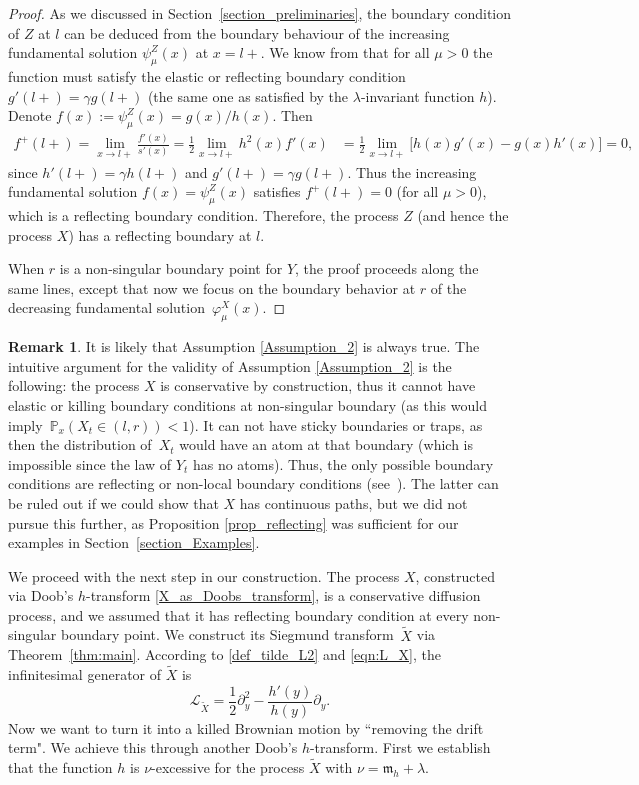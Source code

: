 \documentclass[pdftex]{sigma}
\numberwithin{equation}{section}
\theoremstyle{definition}
\newtheorem{Remark}[Theorem]{Remark}
\def\L{{\mathcal L}}
\def\p{{\mathbb P}}
\begin{document}
\begin{proof}
As we discussed in Section~\ref{section_preliminaries}, the boundary condition of $Z$ at $l$ can be deduced from the boundary behaviour of the increasing fundamental solution $\psi^Z_{\mu}(x)$ at $x=l+$. We know from \cite[Section II.10]{Borodin2002} that for all $\mu>0$ the function  must satisfy the elastic or reflecting boundary condition $g'(l+)=\gamma g(l+)$ (the same one as satisfied by the $\lambda$-invariant function $h$). Denote $f(x):=\psi^Z_{\mu}(x)=g(x)/h(x)$. Then
\begin{align*}
f^+(l+)=\lim\limits_{x\to l+} \frac{f'(x)}{s'(x)}=
\frac{1}{2} \lim\limits_{x\to l+} h^2(x) f'(x)&=
\frac{1}{2} \lim\limits_{x\to l+} \big[
h(x) g'(x)-
g(x) h'(x)
\big]=0,
\end{align*}
since $h'(l+)=\gamma h(l+)$ and $g'(l+)=\gamma g(l+)$.
Thus the increasing fundamental solution $f(x)=\psi^Z_{\mu}(x)$ satisfies $f^+(l+)=0$ (for all $\mu>0$), which is a reflecting boundary condition. Therefore, the process $Z$ (and hence the process $X$) has a reflecting boundary at $l$.

When $r$ is a non-singular boundary point for $Y$, the proof proceeds along the same lines, except that now we focus on the boundary behavior at $r$ of the decreasing fundamental solution~$\varphi^X_{\mu}(x)$.
\end{proof}


\begin{Remark}
It is likely that Assumption \ref{Assumption_2} is always true. The intuitive argument for the validity of Assumption \ref{Assumption_2} is the following: the process $X$ is conservative by construction, thus it cannot have elastic or killing boundary conditions at non-singular boundary (as this would imply~${\p_x(X_t \in (l,r))<1}$). It can not have sticky boundaries or traps, as then the distribution of~$X_t$ would have an atom at that boundary (which is impossible since the law of $Y_t$ has no atoms). Thus, the only possible boundary conditions are reflecting or non-local boundary conditions (see~\cite[Theorem 2, p.\ 39]{Mandl1968}). The latter can be ruled out if we could show that $X$ has continuous paths, but we did not pursue this further, as Proposition \ref{prop_reflecting} was sufficient for our examples in Section~\ref{section_Examples}.
\end{Remark}

We proceed with the next step in our construction. The process $X$, constructed via Doob's $h$-transform \eqref{X_as_Doobs_transform}, is a conservative diffusion process, and we assumed that it has reflecting boundary condition at every non-singular boundary point. We construct its Siegmund transform~$\widetilde X$ via Theorem~\ref{thm:main}. According to \eqref{def_tilde_L2} and \eqref{eqn:L_X}, the infinitesimal generator of $\widetilde X$ is
\[
\L_{\widetilde X}=\frac{1}{2} \partial_y^2 - \frac{h'(y)}{h(y)} \partial_y.
\]
Now we want to turn it into a killed Brownian motion by ``removing the drift term". We achieve this through another Doob's $h$-transform. First we establish that the function $h$ is $\nu$-excessive for the process $\widetilde X$ with $\nu={\mathfrak m}_h+\lambda$.
\end{document}
